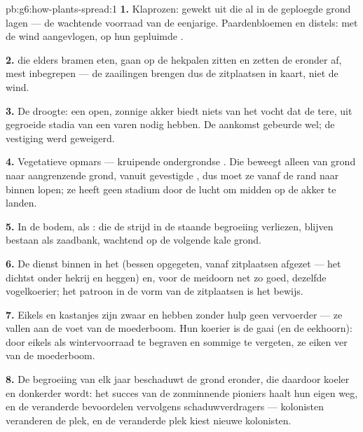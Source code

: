 \begin{solution}{pb:g6:how-plants-spread:1}
\textbf{1.} Klaprozen: gewekt uit  die al in de geploegde grond
lagen --- de wachtende voorraad van de eenjarige. Paardenbloemen en
distels: met de wind aangevlogen, op hun gepluimde .

\textbf{2.}  die elders bramen eten, gaan op de hekpalen zitten en
zetten de  eronder af, mest inbegrepen --- de zaailingen brengen dus
de zitplaatsen in kaart, niet de wind.

\textbf{3.} De droogte: een open, zonnige akker biedt niets van het vocht
dat de tere, uit  gegroeide stadia van een varen nodig hebben. De
aankomst gebeurde wel; de vestiging werd geweigerd.

\textbf{4.} Vegetatieve opmars --- kruipende ondergrondse . Die
beweegt alleen van grond naar aangrenzende grond, vanuit gevestigde
, dus moet ze vanaf de rand naar binnen lopen; ze heeft geen
stadium door de lucht om midden op de akker te landen.

\textbf{5.} In de bodem, als :  die de strijd in de staande
begroeiing verliezen, blijven bestaan als zaadbank, wachtend op de
volgende kale grond.

\textbf{6.} De dienst binnen in het  (bessen opgegeten,  vanaf
zitplaatsen afgezet --- het dichtst onder hekrij en heggen) en, voor de
meidoorn net zo goed, dezelfde vogelkoerier; het patroon in de vorm van
de zitplaatsen is het bewijs.

\textbf{7.} Eikels en kastanjes zijn zwaar en hebben zonder hulp geen
vervoerder --- ze vallen aan de voet van de moederboom. Hun koerier is de
gaai (en de eekhoorn): door eikels als wintervoorraad te begraven en
sommige te vergeten,  ze eiken ver van de moederboom.

\textbf{8.} De begroeiing van elk jaar beschaduwt de grond eronder, die
daardoor koeler en donkerder wordt: het succes van de zonminnende
pioniers haalt hun eigen  weg, en de veranderde
 bevoordelen vervolgens schaduwverdragers --- kolonisten
veranderen de plek, en de veranderde plek kiest nieuwe kolonisten.


\end{solution}
